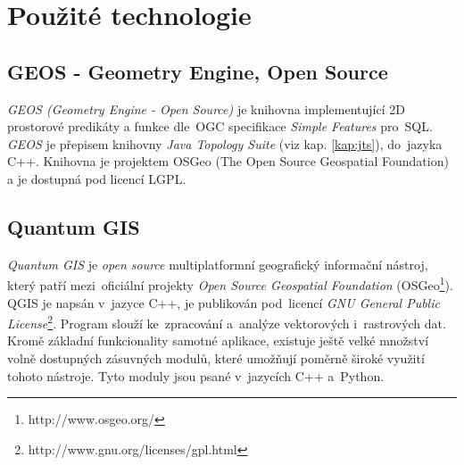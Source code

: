 \chapter{Použité technologie}
\label{4-technologie}


\section{GEOS - Geometry Engine, Open Source}
\label{geos}

\textit{GEOS (Geometry Engine - Open Source)} je knihovna implementující 2D 
prostorové predikáty a funkce dle~OGC specifikace \textit{Simple Features} 
pro~SQL. \textit{GEOS} je přepisem knihovny \textit{Java Topology Suite} 
(viz kap. \ref{kap:jts}), do~jazyka C++. Knihovna je projektem OSGeo 
(The Open Source Geospatial Foundation) a je dostupná pod licencí LGPL.

% 

\section{Quantum GIS}
\label{qgis}

\textit{Quantum GIS} je \textit{open source} multiplatformní geografický 
informační nástroj, který patří mezi~oficiální projekty \textit{Open Source 
Geospatial Foundation} (OSGeo\footnote{http://www.osgeo.org/}). QGIS je 
napsán v~jazyce C++, je publikován pod~licencí \textit{GNU General Public 
License}\footnote{http://www.gnu.org/licenses/gpl.html}. Program slouží 
ke~zpracování a~analýze vektorových i~rastrových dat. Kromě základní 
funkcionality samotné aplikace, existuje ještě velké množství volně 
dostupných zásuvných modulů, které umožňují poměrně široké využití 
tohoto nástroje. Tyto moduly jsou psané v~jazycích C++ a~Python.


